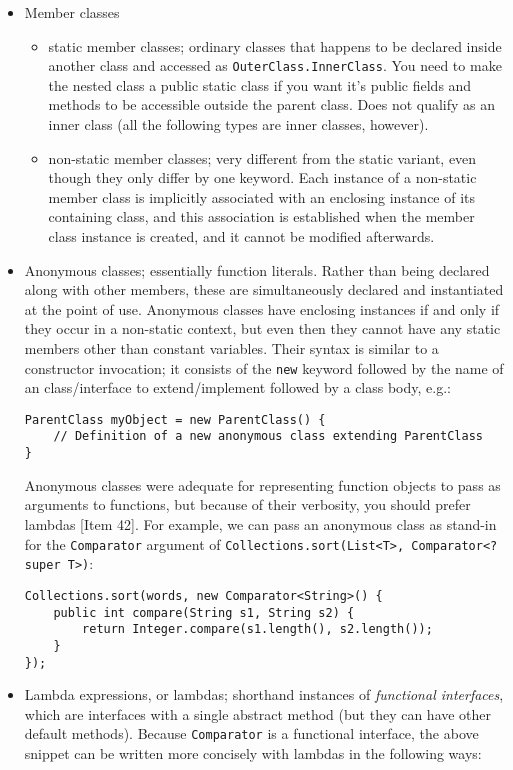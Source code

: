 \documentclass[8pt, table, xcdraw]{article}%
\begin{document}
\begin{itemize}
    \item Member classes
    \begin{itemize}
        \item static member classes; ordinary classes that happens to be declared inside another class and accessed as \lstinline{OuterClass.InnerClass}. You need to make the nested class a public static class if you want it's public fields and methods to be accessible outside the parent class. Does not qualify as an inner class (all the following types are inner classes, however).
        \item non-static member classes; very different from the static variant, even though they only differ by one keyword. Each instance of a non-static member class is implicitly associated with an enclosing instance of its containing class, and this association is established when the member class instance is created, and it cannot be modified afterwards.
    \end{itemize}
    \item Anonymous classes; essentially function literals. Rather than being declared along with other members, these are simultaneously declared and instantiated at the point of use. Anonymous classes have enclosing instances if and only if they occur in a non-static context, but even then they cannot have any static members other than constant variables. Their syntax is similar to a constructor invocation; it consists of the \lstinline{new} keyword followed by the name of an class/interface to extend/implement followed by a class body, e.g.:
    
    \begin{lstlisting}
ParentClass myObject = new ParentClass() {
    // Definition of a new anonymous class extending ParentClass
}
    \end{lstlisting}
    
    Anonymous classes were adequate for representing function objects to pass as arguments to functions, but because of their verbosity, you should prefer lambdas [Item 42]. For example, we can pass an anonymous class as stand-in for the \lstinline{Comparator} argument of \lstinline{Collections.sort(List<T>, Comparator<? super T>)}:

    \begin{lstlisting}
Collections.sort(words, new Comparator<String>() {
    public int compare(String s1, String s2) {
        return Integer.compare(s1.length(), s2.length());
    }
});
    \end{lstlisting}
    \item Lambda expressions, or lambdas; shorthand instances of \emph{functional interfaces}, which are interfaces with a single abstract method (but they can have other default methods). Because \lstinline{Comparator} is a functional interface, the above snippet can be written more concisely with lambdas in the following ways:
    

\end{itemize}
\end{document}
